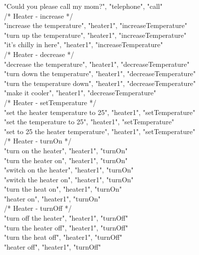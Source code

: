 \documentclass[twoside]{supsistudent}
\begin{document}
\begin{appendices}
        "Could you please call my mom?", "telephone", "call"\\
        /*
        Heater - increase
         */\\
        "increase the temperature", "heater1", "increaseTemperature"\\
        "turn up the temperature", "heater1", "increaseTemperature"\\
        "it’s chilly in here", "heater1", "increaseTemperature"\\
        /*
        Heater - decrease
         */\\
        "decrease the temperature", "heater1", "decreaseTemperature"\\
        "turn down the temperature", "heater1", "decreaseTemperature"\\
        "turn the temperature down", "heater1", "decreaseTemperature"\\
        "make it cooler", "heater1", "decreaseTemperature"\\
        /*
        Heater - setTemperature
         */\\
        "set the heater temperature to 25", "heater1", "setTemperature"\\
        "set the temperature to 25", "heater1", "setTemperature"\\
        "set to 25 the heater temperature", "heater1", "setTemperature"\\
        /*
        Heater - turnOn
         */\\
        "turn on the heater", "heater1", "turnOn"\\
        "turn the heater on", "heater1", "turnOn"\\
        "switch on the heater", "heater1", "turnOn"\\
        "switch the heater on", "heater1", "turnOn"\\
        "turn the heat on", "heater1", "turnOn"\\
        "heater on", "heater1", "turnOn"\\
        /*
        Heater - turnOff
         */\\
        "turn off the heater", "heater1", "turnOff"\\
        "turn the heater off", "heater1", "turnOff"\\
        "turn the heat off", "heater1", "turnOff"\\
        "heater off", "heater1", "turnOff"\\
\end{appendices}
\end{document}
